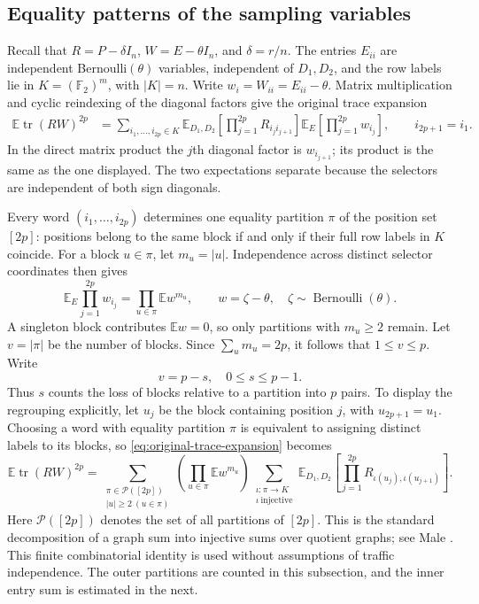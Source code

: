 \documentclass[11pt]{article}
\theoremstyle{definition}
\theoremstyle{remark}
\theoremstyle{plain}
\newcommand{\E}{\mathbb E}
\DeclareMathOperator{\tr}{tr}
\begin{document}
\subsection{Equality patterns of the sampling variables}\label{sec:equality-patterns}

Recall that $R=P-\delta I_n$, $W=E-\theta I_n$, and
$\delta=r/n$. The entries $E_{ii}$ are independent
Bernoulli$(\theta)$ variables, independent of $D_1,D_2$, and the row
labels lie in $K=(\mathbb F_2)^m$, with $|K|=n$. Write
$w_i=W_{ii}=E_{ii}-\theta$. Matrix multiplication and cyclic
reindexing of the diagonal factors give the original trace expansion
\begin{equation}\label{eq:original-trace-expansion}
\begin{split}
 \E\tr(RW)^{2p}
   &=\sum_{i_1,\ldots,i_{2p}\in K}
       \E_{D_1,D_2}\!\left[
                 \prod_{j=1}^{2p}R_{i_j i_{j+1}}\right]
       \E_E\!\left[\prod_{j=1}^{2p}w_{i_j}\right],
 \qquad i_{2p+1}=i_1.
\end{split}
\end{equation}
In the direct matrix product the $j$th diagonal factor is
$w_{i_{j+1}}$; its product is the same as the one displayed.
The two expectations separate because the selectors are independent
of both sign diagonals.

Every word $(i_1,\ldots,i_{2p})$ determines one equality partition
$\pi$ of the position set $[2p]$: positions belong to the same
block if and only if their full row labels in $K$ coincide.
For a block $u\in\pi$, let $m_u=|u|$. Independence across distinct
selector coordinates then gives
\[
 \E_E\prod_{j=1}^{2p}w_{i_j}
      =\prod_{u\in\pi}\E w^{m_u},
 \qquad w=\zeta-\theta,\quad \zeta\sim\operatorname{Bernoulli}(\theta).
\]
A singleton block contributes $\E w=0$, so only partitions with
\(m_u\ge2\) remain. Let $v=|\pi|$ be the number of blocks.
Since $\sum_u m_u=2p$, it follows that $1\le v\le p$. Write
\[
 v=p-s,\quad 0\le s\le p-1.
\]
Thus $s$ counts the loss of blocks relative to a partition into $p$
pairs. To display the regrouping explicitly, let $u_j$ be the block
containing position $j$, with $u_{2p+1}=u_1$. Choosing a word with
equality partition $\pi$ is equivalent to assigning distinct labels
to its blocks, so \eqref{eq:original-trace-expansion} becomes
\[
 \E\tr(RW)^{2p}
 =\sum_{\substack{\pi\in\mathcal P([2p])\\ |u|\ge2\ (u\in\pi)}}
   \left(\prod_{u\in\pi}\E w^{m_u}\right)
   \sum_{\substack{\iota:\pi\to K\\ \iota\ \mathrm{injective}}}
   \E_{D_1,D_2}\!\left[
      \prod_{j=1}^{2p}R_{\iota(u_j),\iota(u_{j+1})}\right].
\]
Here $\mathcal P([2p])$ denotes the set of all partitions of $[2p]$.
This is the standard decomposition of a graph sum into injective
sums over quotient graphs; see Male
\cite[Definition~2.5 and Eq.~(2.2)]{male_traffic}.
This finite combinatorial identity is used without assumptions of
traffic independence.
The outer partitions are counted in this subsection, and
the inner entry sum is estimated in the next.
\end{document}
